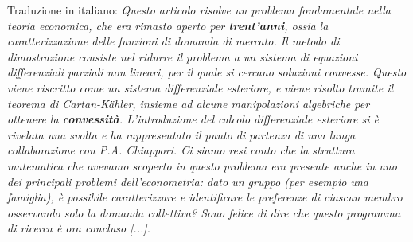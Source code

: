 Traduzione in italiano:
\textit{Questo articolo risolve un problema fondamentale nella teoria economica, che era rimasto aperto per \textbf{trent'anni}, ossia la caratterizzazione delle funzioni di domanda di mercato. Il metodo di dimostrazione consiste nel ridurre il problema a un sistema di equazioni differenziali parziali non lineari, per il quale si cercano soluzioni convesse. Questo viene riscritto come un sistema differenziale esteriore, e viene risolto tramite il teorema di Cartan-Kähler, insieme ad alcune manipolazioni algebriche per ottenere la \textbf{convessità}. L'introduzione del calcolo differenziale esteriore si è rivelata una svolta e ha rappresentato il punto di partenza di una lunga collaborazione con P.A. Chiappori. Ci siamo resi conto che la struttura matematica che avevamo scoperto in questo problema era presente anche in uno dei principali problemi dell'econometria: dato un gruppo (per esempio una famiglia), è possibile caratterizzare e identificare le preferenze di ciascun membro osservando solo la domanda collettiva? Sono felice di dire che questo programma di ricerca è ora concluso [...].}

\newpage
\blankpage




